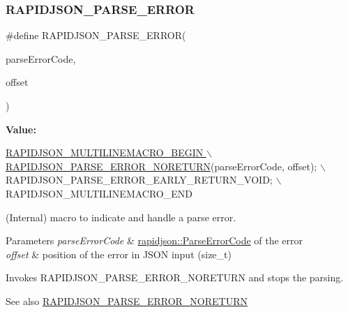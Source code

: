 \subsubsection{\texorpdfstring{R\+A\+P\+I\+D\+J\+S\+O\+N\+\_\+\+P\+A\+R\+S\+E\+\_\+\+E\+R\+R\+OR}{RAPIDJSON\_PARSE\_ERROR}\hspace{0.1cm}{\footnotesize\ttfamily [1/2]}}
{\footnotesize\ttfamily \#define R\+A\+P\+I\+D\+J\+S\+O\+N\+\_\+\+P\+A\+R\+S\+E\+\_\+\+E\+R\+R\+OR(\begin{DoxyParamCaption}\item[{}]{parse\+Error\+Code,  }\item[{}]{offset }\end{DoxyParamCaption})}

{\bfseries Value\+:}
\begin{DoxyCode}
\hyperlink{group__RAPIDJSON__ERRORS_ga7f8c4265b2edda78568ae3338aaf1461}{RAPIDJSON\_MULTILINEMACRO\_BEGIN \(\backslash\)}
\hyperlink{group__RAPIDJSON__ERRORS_ga7f8c4265b2edda78568ae3338aaf1461}{    RAPIDJSON\_PARSE\_ERROR\_NORETURN}(parseErrorCode, offset); \(\backslash\)
    RAPIDJSON\_PARSE\_ERROR\_EARLY\_RETURN\_VOID; \(\backslash\)
    RAPIDJSON\_MULTILINEMACRO\_END
\end{DoxyCode}


(Internal) macro to indicate and handle a parse error. 


\begin{DoxyParams}{Parameters}
{\em parse\+Error\+Code} & \hyperlink{group__RAPIDJSON__ERRORS_ga8d4b32dfc45840bca189ade2bbcb6ba7}{rapidjson\+::\+Parse\+Error\+Code} of the error \\
\hline
{\em offset} & position of the error in J\+S\+ON input ({\ttfamily size\+\_\+t})\\
\hline
\end{DoxyParams}
Invokes R\+A\+P\+I\+D\+J\+S\+O\+N\+\_\+\+P\+A\+R\+S\+E\+\_\+\+E\+R\+R\+O\+R\+\_\+\+N\+O\+R\+E\+T\+U\+RN and stops the parsing.

\begin{DoxySeeAlso}{See also}
\hyperlink{group__RAPIDJSON__ERRORS_ga7f8c4265b2edda78568ae3338aaf1461}{R\+A\+P\+I\+D\+J\+S\+O\+N\+\_\+\+P\+A\+R\+S\+E\+\_\+\+E\+R\+R\+O\+R\+\_\+\+N\+O\+R\+E\+T\+U\+RN} 
\end{DoxySeeAlso}
\mbox{\label{group__RAPIDJSON__ERRORS_gae3689840fa6e89a241313f33b602f865}} 
